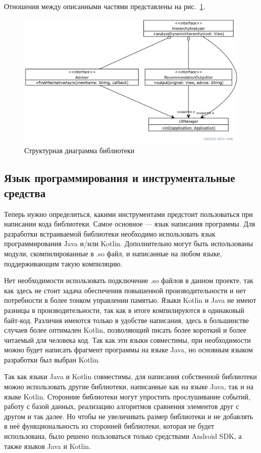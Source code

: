 \documentclass[a4paper,14pt]{extarticle} %
\begin{document}
	Отношения между описанными частями представлены на рис.~\ref{fig:uml_interfaces}.

	\begin{figure}[htb]
		\includegraphics[width=\textwidth]{uml_interfaces}
		\caption{Структурная диаграмма библиотеки}
		\label{fig:uml_interfaces}
	\end{figure}
	
	\subsection{Язык программирования и  инструментальные средства}
	
	Теперь нужно определиться, какими инструментами предстоит пользоваться при написании кода библиотеки. Самое основное --- язык написания программы. Для разработки встраиваемой библиотеки необходимо использовать язык программирования Java и/или Kotlin. Дополнительно могут быть использованы модули, скомпилированные в .so файл, и написанные на любом языке, поддерживающим такую компиляцию. 
	
	Нет необходимости использовать подключение .so файлов в данном проекте, так как здесь не стоит задача обеспечения повышенной производительности и нет потребности в более тонком управлении памятью. Языки Kotlin и Java не имеют разницы в производительности, так как в итоге компилируются в одинаковый байт-код. Различия имеются только в удобстве написания, здесь в большинстве случаев более оптимален Kotlin, позволяющий писать более короткий и более читаемый для человека код. Так как эти языки совместимы, при необходимости можно будет написать фрагмент программы на языке Java, но основным языком разработки был выбран Kotlin.
	
	Так как языки Java и Kotlin совместимы, для написания собственной библиотеки можно использовать другие библиотеки, написанные как на языке Java, так и на языке Kotlin. Сторонние библиотеки могут упростить прослушивание событий, работу с базой данных, реализацию алгоритмов сравнения элементов друг с другом и так далее. Но чтобы не увеличивать размер библиотеки и не добавлять в неё функциональность из сторонней библиотеки, которая не будет использована, было решено пользоваться только средствами Android SDK, а также языков Java и Kotlin.
	
\end{document}
